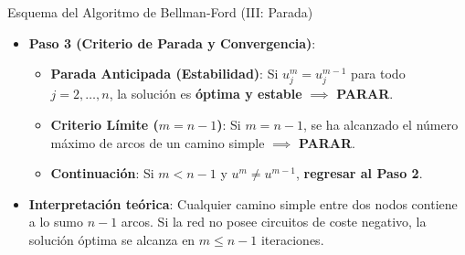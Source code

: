 \documentclass[
  ignorenonframetext,
]{beamer}
\providecommand{\tightlist}{%
  \setlength{\itemsep}{0pt}\setlength{\parskip}{0pt}}
\begin{document}
\begin{frame}{Esquema del Algoritmo de Bellman-Ford (III: Parada)}
\label{esquema-del-algoritmo-de-bellman-ford-iii-parada}
\begin{tcolorbox}[enhanced jigsaw, colframe=quarto-callout-note-color-frame, toptitle=1mm, colback=white, colbacktitle=quarto-callout-note-color!10!white, titlerule=0mm, breakable, coltitle=black, opacityback=0, bottomrule=.15mm, title=\textcolor{quarto-callout-note-color}{\faInfo}\hspace{0.5em}{Algoritmo de Bellman-Ford --- Paso 3: Criterios de Parada}, rightrule=.15mm, arc=.35mm, leftrule=.75mm, left=2mm, toprule=.15mm, bottomtitle=1mm, opacitybacktitle=0.6]

\begin{itemize}
\item
  \textbf{Paso 3 (Criterio de Parada y Convergencia)}:

  \begin{itemize}
  \item
    \textbf{Parada Anticipada (Estabilidad)}: Si \(u_j^m = u_j^{m-1}\)
    para todo \(j = 2, \dots, n\), la solución es \textbf{óptima y
    estable} \(\implies\) \textbf{PARAR}.
  \item
    \textbf{Criterio Límite (\(m = n - 1\))}: Si \(m = n - 1\), se ha
    alcanzado el número máximo de arcos de un camino simple \(\implies\)
    \textbf{PARAR}.
  \item
    \textbf{Continuación}: Si \(m < n - 1\) y \(u^m \neq u^{m-1}\),
    \textbf{regresar al Paso 2}.
  \end{itemize}
\end{itemize}

\end{tcolorbox}

\begin{itemize}
\tightlist
\item
  \textbf{Interpretación teórica}: Cualquier camino simple entre dos
  nodos contiene a lo sumo \(n-1\) arcos. Si la red no posee circuitos
  de coste negativo, la solución óptima se alcanza en \(m \le n-1\)
  iteraciones.
\end{itemize}
\end{frame}
\end{document}

